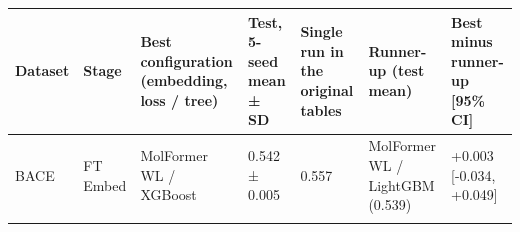 \documentclass[
  10pt,
]{article}
\begin{document}
\begin{longtable}[]{@{}lllllll@{}}
\toprule
\begin{minipage}[b]{0.12\columnwidth}\raggedright
Dataset\strut
\end{minipage} & \begin{minipage}[b]{0.12\columnwidth}\raggedright
Stage\strut
\end{minipage} & \begin{minipage}[b]{0.12\columnwidth}\raggedright
Best configuration (embedding, loss / tree)\strut
\end{minipage} & \begin{minipage}[b]{0.12\columnwidth}\raggedright
Test, 5-seed mean ± SD\strut
\end{minipage} & \begin{minipage}[b]{0.12\columnwidth}\raggedright
Single run in the original tables\strut
\end{minipage} & \begin{minipage}[b]{0.12\columnwidth}\raggedright
Runner-up (test mean)\strut
\end{minipage} & \begin{minipage}[b]{0.12\columnwidth}\raggedright
Best minus runner-up {[}95\% CI{]}\strut
\end{minipage}\tabularnewline
\midrule
\endhead
\begin{minipage}[t]{0.12\columnwidth}\raggedright
BACE\strut
\end{minipage} & \begin{minipage}[t]{0.12\columnwidth}\raggedright
FT Embed\strut
\end{minipage} & \begin{minipage}[t]{0.12\columnwidth}\raggedright
MolFormer WL / XGBoost\strut
\end{minipage} & \begin{minipage}[t]{0.12\columnwidth}\raggedright
0.542 ± 0.005\strut
\end{minipage} & \begin{minipage}[t]{0.12\columnwidth}\raggedright
0.557\strut
\end{minipage} & \begin{minipage}[t]{0.12\columnwidth}\raggedright
MolFormer WL / LightGBM (0.539)\strut
\end{minipage} & \begin{minipage}[t]{0.12\columnwidth}\raggedright
+0.003 {[}-0.034, +0.049{]}\strut
\end{minipage}\tabularnewline
\begin{minipage}[t]{0.12\columnwidth}\raggedright

\end{minipage}
\end{longtable}
\end{document}
